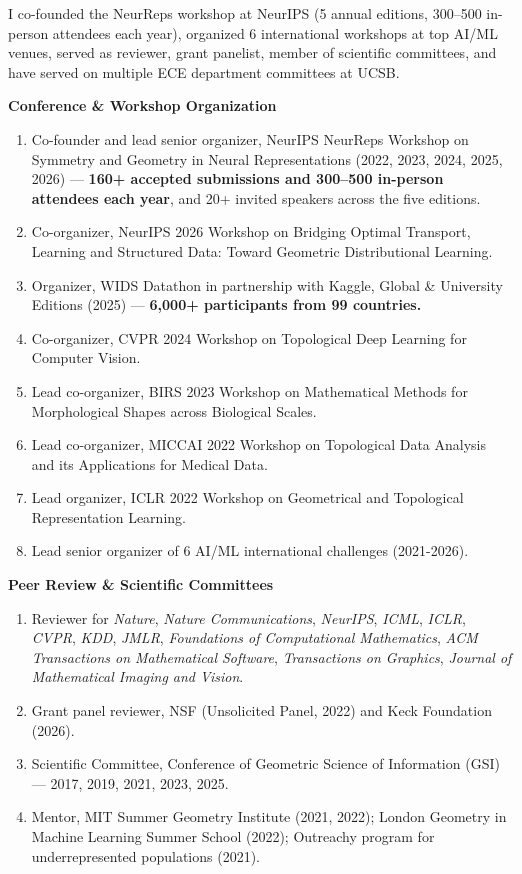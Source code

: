 I co-founded the NeurReps workshop at NeurIPS (5 annual editions, 300--500 in-person attendees each year), organized 6 international workshops at top AI/ML venues, served as reviewer, grant panelist, member of scientific committees, and have served on multiple ECE department committees at UCSB.


\begingroup\small

\noindent\textbf{Conference \& Workshop Organization}
\begin{enumerate}[leftmargin=*,itemsep=0.1em,topsep=0.15em,parsep=0pt,partopsep=0pt]
    \item Co-founder and lead senior organizer, NeurIPS NeurReps Workshop on Symmetry and Geometry in Neural Representations (2022, 2023, 2024, 2025, 2026) --- \textbf{160+ accepted submissions and 300–500 in-person attendees each year}, and 20+ invited speakers across the five editions.
    \item Co-organizer, NeurIPS 2026 Workshop on Bridging Optimal Transport, Learning and Structured Data: Toward Geometric Distributional Learning. 
    \item Organizer, WIDS Datathon in partnership with Kaggle, Global \& University Editions (2025) --- \textbf{6,000+ participants from 99 countries.}
    \item Co-organizer, CVPR 2024 Workshop on Topological Deep Learning for Computer Vision.
    \item Lead co-organizer, BIRS 2023 Workshop on Mathematical Methods for Morphological Shapes across Biological Scales.
    \item Lead co-organizer, MICCAI 2022 Workshop on Topological Data Analysis and its Applications for Medical Data.
    \item Lead organizer, ICLR 2022 Workshop on Geometrical and Topological Representation Learning.
    \item Lead senior organizer of 6 AI/ML international challenges (2021-2026).
\end{enumerate}


\smallskip
\noindent\textbf{Peer Review \& Scientific Committees}
\begin{enumerate}[leftmargin=*,itemsep=0.1em,topsep=0.15em,parsep=0pt,partopsep=0pt]
    \item Reviewer for \textit{Nature}, \textit{Nature Communications}, \textit{NeurIPS}, \textit{ICML}, \textit{ICLR}, \textit{CVPR}, \textit{KDD}, \textit{JMLR}, \textit{Foundations of Computational Mathematics}, \textit{ACM Transactions on Mathematical Software}, \textit{Transactions on Graphics}, \textit{Journal of Mathematical Imaging and Vision}.
    \item Grant panel reviewer, NSF (Unsolicited Panel, 2022) and Keck Foundation (2026).
    \item Scientific Committee, Conference of Geometric Science of Information (GSI) --- 2017, 2019, 2021, 2023, 2025.
    \item Mentor, MIT Summer Geometry Institute (2021, 2022); London Geometry in Machine Learning Summer School (2022); Outreachy program for underrepresented populations (2021).
\end{enumerate}


